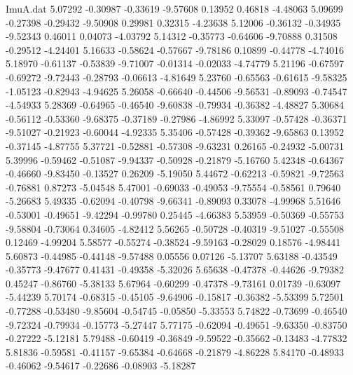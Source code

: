 \begin{filecontents}{ImuA.dat}
   5.07292   -0.30987   -0.33619   -9.57608    0.13952    0.46818   -4.48063
   5.09699   -0.27398   -0.29432   -9.50908    0.29981    0.32315   -4.23638
   5.12006   -0.36132   -0.34935   -9.52343    0.46011    0.04073   -4.03792
   5.14312   -0.35773   -0.64606   -9.70888    0.31508   -0.29512   -4.24401
   5.16633   -0.58624   -0.57667   -9.78186    0.10899   -0.44778   -4.74016
   5.18970   -0.61137   -0.53839   -9.71007   -0.01314   -0.02033   -4.74779
   5.21196   -0.67597   -0.69272   -9.72443   -0.28793   -0.06613   -4.81649
   5.23760   -0.65563   -0.61615   -9.58325   -1.05123   -0.82943   -4.94625
   5.26058   -0.66640   -0.44506   -9.56531   -0.89093   -0.74547   -4.54933
   5.28369   -0.64965   -0.46540   -9.60838   -0.79934   -0.36382   -4.48827
   5.30684   -0.56112   -0.53360   -9.68375   -0.37189   -0.27986   -4.86992
   5.33097   -0.57428   -0.36371   -9.51027   -0.21923   -0.60044   -4.92335
   5.35406   -0.57428   -0.39362   -9.65863    0.13952   -0.37145   -4.87755
   5.37721   -0.52881   -0.57308   -9.63231    0.26165   -0.24932   -5.00731
   5.39996   -0.59462   -0.51087   -9.94337   -0.50928   -0.21879   -5.16760
   5.42348   -0.64367   -0.46660   -9.83450   -0.13527    0.26209   -5.19050
   5.44672   -0.62213   -0.59821   -9.72563   -0.76881    0.87273   -5.04548
   5.47001   -0.69033   -0.49053   -9.75554   -0.58561    0.79640   -5.26683
   5.49335   -0.62094   -0.40798   -9.66341   -0.89093    0.33078   -4.99968
   5.51646   -0.53001   -0.49651   -9.42294   -0.99780    0.25445   -4.66383
   5.53959   -0.50369   -0.55753   -9.58804   -0.73064    0.34605   -4.82412
   5.56265   -0.50728   -0.40319   -9.51027   -0.55508    0.12469   -4.99204
   5.58577   -0.55274   -0.38524   -9.59163   -0.28029    0.18576   -4.98441
   5.60873   -0.44985   -0.44148   -9.57488    0.05556    0.07126   -5.13707
   5.63188   -0.43549   -0.35773   -9.47677    0.41431   -0.49358   -5.32026
   5.65638   -0.47378   -0.44626   -9.79382    0.45247   -0.86760   -5.38133
   5.67964   -0.60299   -0.47378   -9.73161    0.01739   -0.63097   -5.44239
   5.70174   -0.68315   -0.45105   -9.64906   -0.15817   -0.36382   -5.53399
   5.72501   -0.77288   -0.53480   -9.85604   -0.54745   -0.05850   -5.33553
   5.74822   -0.73699   -0.46540   -9.72324   -0.79934   -0.15773   -5.27447
   5.77175   -0.62094   -0.49651   -9.63350   -0.83750   -0.27222   -5.12181
   5.79488   -0.60419   -0.36849   -9.59522   -0.35662   -0.13483   -4.77832
   5.81836   -0.59581   -0.41157   -9.65384   -0.64668   -0.21879   -4.86228
   5.84170   -0.48933   -0.46062   -9.54617   -0.22686   -0.08903   -5.18287

\end{filecontents}
